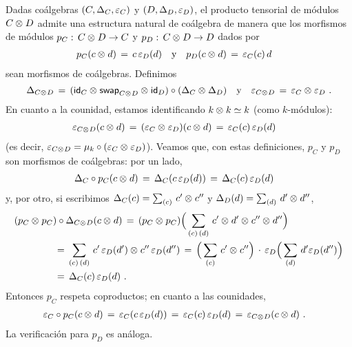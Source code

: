 Dadas co\'{a}lgebras $(C,\coproducto[C],\counidad[C])$ y
$(D,\coproducto[D],\counidad[D])$, el producto tensorial de m\'{o}dulos
$C\tensor D$ admite una estructura natural de co\'{a}lgebra de manera que los
morfismos de m\'{o}dulos $p_C:\,C\tensor D\rightarrow C$ y
$p_D:\,C\tensor D\rightarrow D$ dados por
\begin{align*}
	p_C(c\tensor d) \,=\,c\,\counidad[D](d)
		& \quad\text{y}\quad
	p_D(c\tensor d) \,=\,\counidad[C](c)\,d
\end{align*}
%
sean morfismos de co\'{a}lgebras. Definimos
\begin{equation}
	\label{eq:productotensorialdecoalgebras}
	\coproducto[C\tensor D] \,=\,
		(\id[C]\tensor\swap[C\tensor D]\tensor\id[D])\circ
		(\coproducto[C]\tensor\coproducto[D])
		\quad\text{y}\quad
	\counidad[C\tensor D] \,=\,\counidad[C]\tensor\counidad[D]
	\text{ .}
\end{equation}
%
En cuanto a la counidad, estamos identificando $k\tensor k\simeq k$ (como
$k$-m\'{o}dulos):
\begin{align*}
	\counidad[C\tensor D](c\tensor d) & \,=\,
		(\counidad[C]\tensor\counidad[D])(c\tensor d) \,=\,
		\counidad[C](c)\,\counidad[D](d)
\end{align*}
%
(es decir,
\begin{math}
	\counidad[C\tensor D]=
		\producto[k]\circ(\counidad[C]\tensor\counidad[D])
\end{math}). Veamos que, con estas definiciones, $p_C$ y $p_D$ son morfismos de
co\'{a}lgebras: por un lado,
\begin{align*}
	\coproducto[C]\circ p_C(c\tensor d) & \,=\,
		\coproducto[C](c\,\counidad[D](d)) \,=\,
		\coproducto[C](c)\,\counidad[D](d)
\end{align*}
%
y, por otro, si escribimos $\coproducto[C](c)=\sum_{(c)}\,c'\tensor c''$ y
$\coproducto[D](d)=\sum_{(d)}\,d'\tensor d''$, 
\begin{align*}
	& (p_C\tensor p_C)\circ\coproducto[C\tensor D] (c\tensor d) \,=\,
		(p_C\tensor p_C)\Big(\sum_{(c)\,(d)}\,
			c'\tensor d'\tensor c''\tensor d''\Big) \\
	& \qquad\qquad\,=\,
		\sum_{(c)\,(d)}\,c'\,\counidad[D](d')\tensor
			c''\,\counidad[D](d'') \,=\,
		\Big(\sum_{(c)}\,c'\tensor c''\Big)\,\cdot\,
			\counidad[D]\Big(\sum_{(d)}\,d'\counidad[D](d'')
			\Big) \\
	& \qquad\qquad\,=\,
		\coproducto[C](c)\,\counidad[D](d)
	\text{ .}
\end{align*}
%
Entonces $p_C$ respeta coproductos; en cuanto a las counidades,
\begin{align*}
	\counidad[C]\circ p_C(c\tensor d) & \,=\,
		\counidad[C](c\,\counidad[D](d)) \,=\,
		\counidad[C](c)\,\counidad[D](d) \,=\,
		\counidad[C\tensor D](c\tensor d)
	\text{ .}
\end{align*}
%
La verificaci\'{o}n para $p_D$ es an\'{a}loga.

